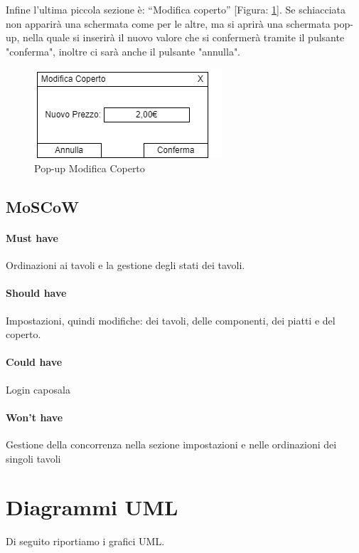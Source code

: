 \documentclass[12pt, letterpaper]{book}
\begin{document}
Infine l'ultima piccola sezione è: “Modifica coperto” [Figura: \ref{PopupCoperto}]. Se schiacciata non apparirà una schermata come per le altre, ma si aprirà una schermata pop-up, nella quale si inserirà il nuovo valore che si confermerà tramite il pulsante "conferma", inoltre ci sarà anche il pulsante "annulla".
\begin{figure}[H]
    \centering
    \includegraphics[width = 0.4 \linewidth]{../Documentazione/Drawio/ModificaCoperto.png}
    \caption{Pop-up Modifica Coperto}
    \label{PopupCoperto}
\end{figure}


\section{MoSCoW}
\subsubsection{Must have}
Ordinazioni ai tavoli e la gestione degli stati dei tavoli.
\subsubsection{Should have}
Impostazioni, quindi modifiche: dei tavoli, delle componenti, dei piatti e del coperto.
\subsubsection{Could have}
Login caposala
\subsubsection{Won't have}
Gestione della concorrenza nella sezione impostazioni e nelle ordinazioni dei singoli tavoli

\chapter{Diagrammi UML}
Di seguito riportiamo i grafici UML.
\end{document}
